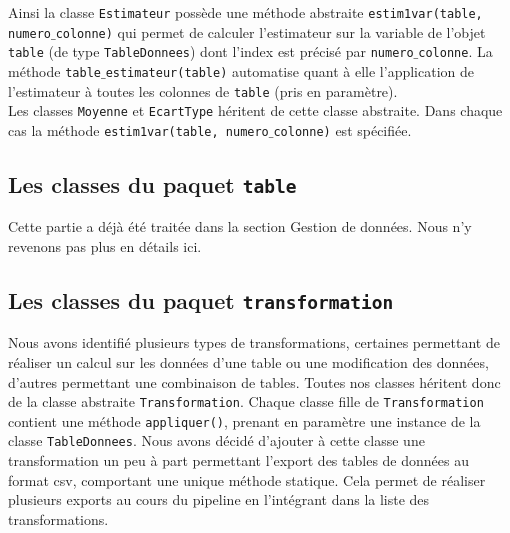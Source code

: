 \documentclass[11pt]{article}
\begin{document}
Ainsi la classe \texttt{Estimateur} possède une méthode abstraite \texttt{estim1var(table, numero$\_$colonne)} qui permet de calculer l'estimateur sur la variable de l'objet \texttt{table} (de type \texttt{TableDonnees}) dont l'index est précisé par \texttt{numero$\_$colonne}. La méthode \texttt{table$\_$estimateur(table)} automatise quant à elle l'application de l'estimateur à toutes les colonnes de \texttt{table} (pris en paramètre). \\

Les classes \texttt{Moyenne} et \texttt{EcartType} héritent de cette classe abstraite. Dans chaque cas la méthode \texttt{estim1var(table, numero$\_$colonne)} est spécifiée.


\subsection{Les classes du paquet \texttt{table}}

Cette partie a déjà été traitée dans la section Gestion de données. Nous n'y revenons pas plus en détails ici. 

\subsection{Les classes du paquet \texttt{transformation}}

Nous avons identifié plusieurs types de transformations, certaines permettant de réaliser un calcul sur les données d'une table ou une modification des données, d'autres permettant une combinaison de tables. Toutes nos classes héritent donc de la classe abstraite \texttt{Transformation}. Chaque classe fille de \texttt{Transformation} contient une méthode \texttt{appliquer()}, prenant en paramètre une instance de la classe \texttt{TableDonnees}. Nous avons décidé d'ajouter à cette classe une transformation un peu à part permettant l'export des tables de données au format csv, comportant une unique méthode statique. Cela permet de réaliser plusieurs exports au cours du pipeline en l'intégrant dans la liste des transformations.\\
\end{document}
